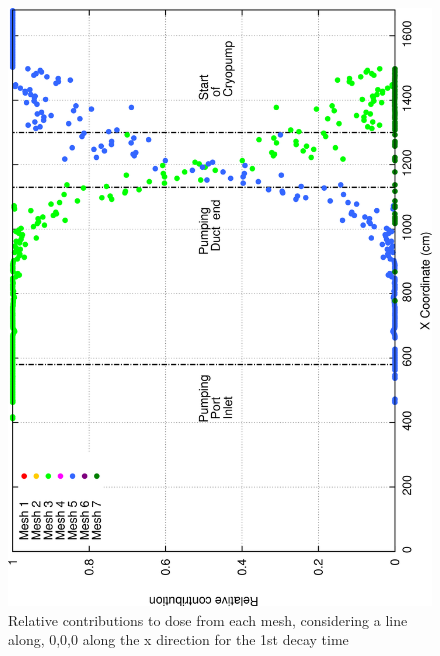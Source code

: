 \documentclass[12pt]{article}
\begin{document}
\begin{figure}[ht!]
\centering
\includegraphics[clip,scale=0.25]{../plots/crosstalk/b4c/lp/dc1_rel.png}
\caption{Relative contributions to dose from each mesh, considering a line along, 0,0,0 along the x direction for the 1st decay time}
\label{fig:b4c_ct_lp_dc1_rel}
\end{figure}
\end{document}
